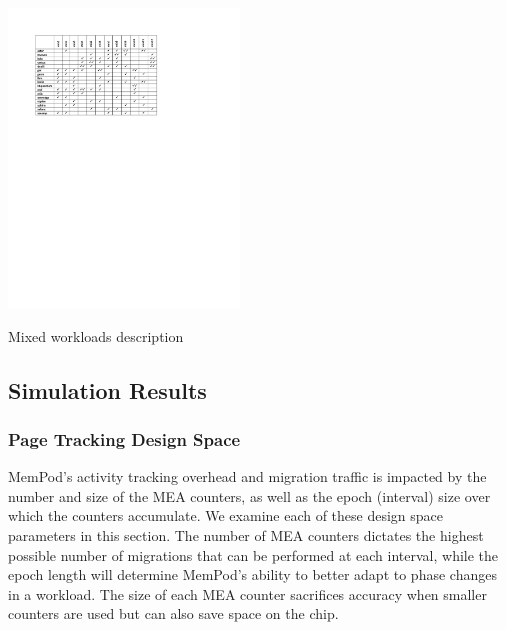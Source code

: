 

\begin{table}
  \includegraphics[width=0.46\textwidth]{figures/workloads_checkmarks.pdf}
  \caption{Mixed workloads description}
  \label{tab:workloads}
\end{table}

\subsection{Simulation Results}
\label{sub:SimResults}

\subsubsection{Page Tracking Design Space}


MemPod's activity tracking overhead and migration traffic is impacted by
the number and size of the MEA counters, as well as the epoch (interval) 
size over
which the counters accumulate.  We examine each of these design space
parameters in this section.
The number of MEA counters dictates the highest possible number of 
migrations that can be performed at each interval, while the epoch length will determine MemPod's ability to better adapt to phase changes in a workload. The size of each MEA counter sacrifices accuracy when smaller counters are used 
but can also save space on the chip.

